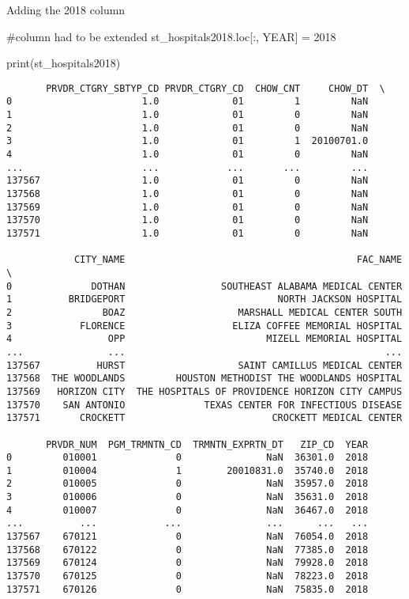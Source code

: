 \documentclass[
  letterpaper,
  DIV=11,
  numbers=noendperiod]{scrartcl}
\newenvironment{Shaded}{\begin{snugshade}}{\end{snugshade}}
\newcommand{\BuiltInTok}[1]{\textcolor[rgb]{0.00,0.23,0.31}{#1}}
\newcommand{\CommentTok}[1]{\textcolor[rgb]{0.37,0.37,0.37}{#1}}
\newcommand{\DecValTok}[1]{\textcolor[rgb]{0.68,0.00,0.00}{#1}}
\newcommand{\NormalTok}[1]{\textcolor[rgb]{0.00,0.23,0.31}{#1}}
\newcommand{\OperatorTok}[1]{\textcolor[rgb]{0.37,0.37,0.37}{#1}}
\newcommand{\StringTok}[1]{\textcolor[rgb]{0.13,0.47,0.30}{#1}}
\begin{document}
Adding the 2018 column

\begin{Shaded}
\begin{Highlighting}[]
\CommentTok{\#column had to be extended}
\NormalTok{st\_hospitals2018.loc[:, }\StringTok{\textquotesingle{}YEAR\textquotesingle{}}\NormalTok{] }\OperatorTok{=} \DecValTok{2018}

\BuiltInTok{print}\NormalTok{(st\_hospitals2018)}
\end{Highlighting}
\end{Shaded}

\begin{verbatim}
       PRVDR_CTGRY_SBTYP_CD PRVDR_CTGRY_CD  CHOW_CNT     CHOW_DT  \
0                       1.0             01         1         NaN   
1                       1.0             01         0         NaN   
2                       1.0             01         0         NaN   
3                       1.0             01         1  20100701.0   
4                       1.0             01         0         NaN   
...                     ...            ...       ...         ...   
137567                  1.0             01         0         NaN   
137568                  1.0             01         0         NaN   
137569                  1.0             01         0         NaN   
137570                  1.0             01         0         NaN   
137571                  1.0             01         0         NaN   

            CITY_NAME                                         FAC_NAME  \
0              DOTHAN                 SOUTHEAST ALABAMA MEDICAL CENTER   
1          BRIDGEPORT                           NORTH JACKSON HOSPITAL   
2                BOAZ                    MARSHALL MEDICAL CENTER SOUTH   
3            FLORENCE                   ELIZA COFFEE MEMORIAL HOSPITAL   
4                 OPP                         MIZELL MEMORIAL HOSPITAL   
...               ...                                              ...   
137567          HURST                    SAINT CAMILLUS MEDICAL CENTER   
137568  THE WOODLANDS         HOUSTON METHODIST THE WOODLANDS HOSPITAL   
137569   HORIZON CITY  THE HOSPITALS OF PROVIDENCE HORIZON CITY CAMPUS   
137570    SAN ANTONIO              TEXAS CENTER FOR INFECTIOUS DISEASE   
137571       CROCKETT                          CROCKETT MEDICAL CENTER   

       PRVDR_NUM  PGM_TRMNTN_CD  TRMNTN_EXPRTN_DT   ZIP_CD  YEAR  
0         010001              0               NaN  36301.0  2018  
1         010004              1        20010831.0  35740.0  2018  
2         010005              0               NaN  35957.0  2018  
3         010006              0               NaN  35631.0  2018  
4         010007              0               NaN  36467.0  2018  
...          ...            ...               ...      ...   ...  
137567    670121              0               NaN  76054.0  2018  
137568    670122              0               NaN  77385.0  2018  
137569    670124              0               NaN  79928.0  2018  
137570    670125              0               NaN  78223.0  2018  
137571    670126              0               NaN  75835.0  2018  


\end{verbatim}
\end{document}
